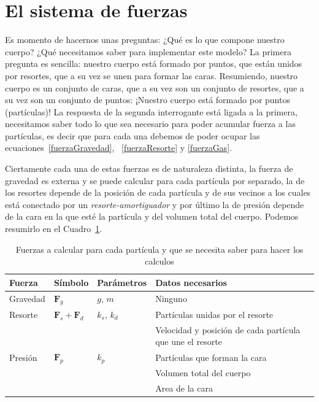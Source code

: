 \section{El sistema de fuerzas}
Es momento de hacernos unas preguntas:
¿Qué es lo que compone nuestro cuerpo?
¿Qué necesitamos saber para implementar este modelo?
La primera pregunta es sencilla: nuestro cuerpo está formado por puntos, que están unidos por resortes, que a su vez se unen para formar las caras.
Resumiendo, nuestro cuerpo es un conjunto de caras, que a su vez son un conjunto de resortes, que a su vez son un conjunto de puntos:
¡Nuestro cuerpo está formado por puntos (partículas)!
La respuesta de la segunda interrogante está ligada a la primera, necesitamos saber todo lo que sea necesario para poder acumular fuerza a las partículas, es decir que para cada una debemos de poder ocupar las ecuaciones~\eqref{fuerzaGravedad}, ~\eqref{fuerzaResorte} y \eqref{fuerzaGas}.

Ciertamente cada una de estas fuerzas es de naturaleza distinta, la fuerza de gravedad es externa y se puede calcular para cada partícula por separado, la de los resortes depende de la posición de cada partícula y de sus vecinos a los cuales está conectado por un \emph{resorte-amortiguador} y por último la de presión depende de la cara en la que esté la partícula y del volumen total del cuerpo.
Podemos resumirlo en el Cuadro~\ref{ejemplo:fuerzas}.

\begin{table}
\begin{center}
\begin{tabular} {@{}llll@{}} 
\toprule
Fuerza & Símbolo &  Parámetros & Datos necesarios \\ 
\midrule
Gravedad & $ \textbf{F}_g $ & $g$, $m$ & Ninguno \\
Resorte & $ \textbf{F}_s + \textbf{F}_d $ & $k_s$, $k_d$ & Partículas unidas por el resorte \\
& & & Velocidad y posición de cada partícula que une el resorte \\
Presión & $ \textbf{F}_p $ & $k_p$ & Partículas que forman la cara \\ 
& & & Volumen total del cuerpo \\ 
& & & Area de la cara \\ 
\bottomrule
\end{tabular}
\end{center}
\caption[Resumen de las fuerzas que actúan sobre cada partícula]{Fuerzas a calcular para cada partícula y que se necesita saber para hacer los calculos}
\label{ejemplo:fuerzas}
\end{table}

